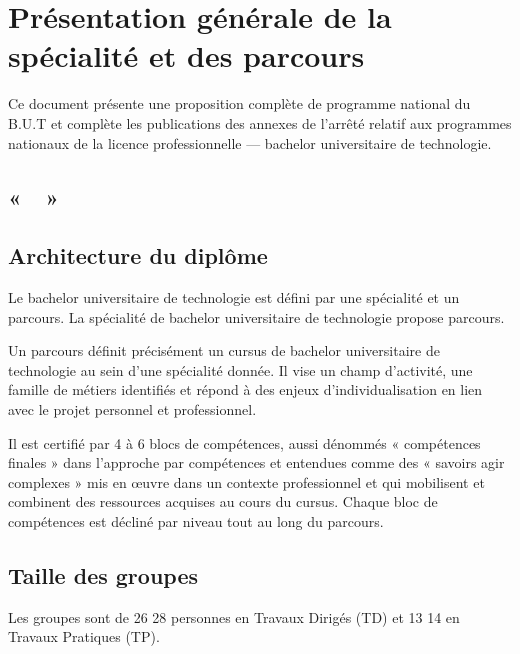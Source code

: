 \documentclass[10pt]{article}
\begin{document}
\newpage
\section[Présentation générale]{Présentation générale de la spécialité et des parcours}
Ce document présente une proposition complète de programme national du
B.U.T  et complète les publications des annexes de
l'arrêté relatif aux programmes nationaux de la licence professionnelle
— bachelor universitaire de technologie.



\subsection*{ «~~»}

\subsection[Architecture du diplôme]{Architecture du diplôme}
Le bachelor universitaire de technologie est défini par une spécialité
et un parcours. La spécialité  de bachelor
universitaire de technologie propose 
parcours.

Un parcours définit précisément un cursus de bachelor universitaire de technologie au sein d’une
spécialité donnée. Il vise un champ d’activité, une famille de métiers identifiés et répond à des
enjeux d’individualisation en lien avec le projet personnel et professionnel.

Il est certifié par 4 à 6 blocs de compétences, aussi dénommés « compétences finales » dans
l’approche par compétences et entendues comme des « savoirs agir complexes » mis en œuvre
dans un contexte professionnel et qui mobilisent et combinent des ressources acquises au cours du
cursus. Chaque bloc de compétences est décliné par niveau tout au long du parcours.

\subsection{Taille des groupes}
Les groupes sont de
26
28
personnes en Travaux Dirigés (TD) et
13
14
en Travaux Pratiques (TP).
\end{document}
